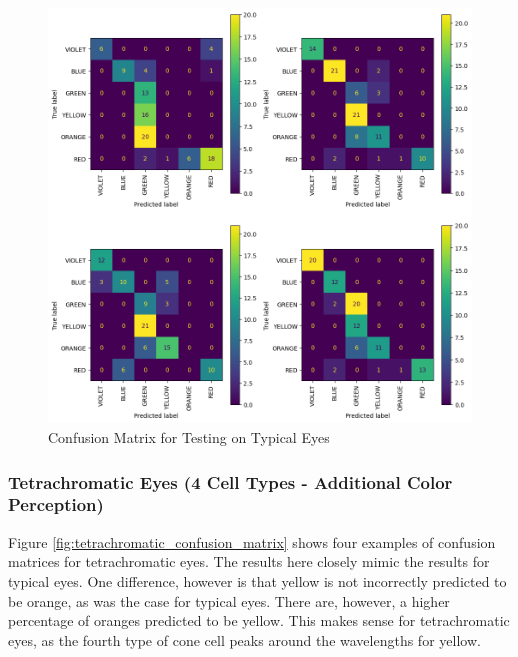 \documentclass[titlepage]{article}
\begin{document}
\begin{figure}[H]
    \centering
    \includegraphics[width=\textwidth]{figs/colorblind_confusion_matrix.png}
    \caption{Confusion Matrix for Testing on Typical Eyes}
    \label{fig:colorblind_confusion_matrix}
\end{figure}

\subsubsection{Tetrachromatic Eyes (4 Cell Types - Additional Color Perception)}

Figure \ref{fig:tetrachromatic_confusion_matrix} shows four examples of confusion matrices for tetrachromatic eyes. The results here closely mimic the results for typical eyes. One difference, however is that yellow is not incorrectly predicted to be orange, as was the case for typical eyes. There are, however, a higher percentage of oranges predicted to be yellow. This makes sense for tetrachromatic eyes, as the fourth type of cone cell peaks around the wavelengths for yellow.
\end{document}
